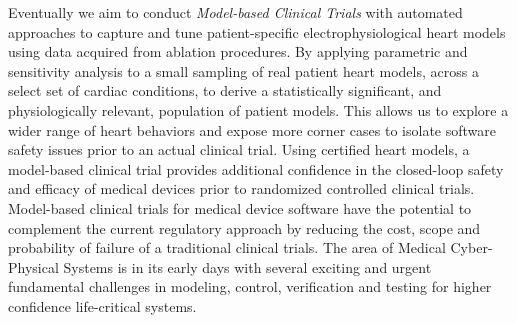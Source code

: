 

Eventually we aim to conduct \emph{Model-based Clinical Trials} with automated approaches to capture and tune patient-specific electrophysiological heart models using data acquired from ablation procedures. By applying parametric and sensitivity analysis to a small sampling of real patient heart models, across a select set of cardiac conditions, to derive a statistically significant, and physiologically relevant, population of patient models. This allows us to explore a wider range of heart behaviors and expose more corner cases to isolate software safety issues prior to an actual clinical trial. Using certified heart models, a model-based clinical trial provides additional confidence in the closed-loop safety and efficacy of medical devices prior to randomized controlled clinical trials. Model-based clinical trials for medical device software have the potential to complement the current regulatory approach by reducing the cost, scope and probability of failure of a traditional clinical trials. The area of Medical Cyber-Physical Systems is in its early days with several exciting and urgent fundamental challenges in modeling, control, verification and testing for higher confidence life-critical systems.

